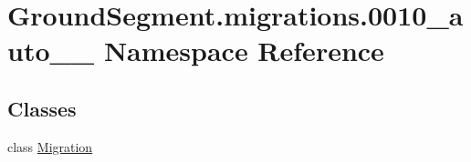 \hypertarget{namespace_ground_segment_1_1migrations_1_10010__auto__20161127__2017}{}\section{Ground\+Segment.\+migrations.0010\+\_\+auto\+\_\+\_ Namespace Reference}
\label{namespace_ground_segment_1_1migrations_1_10010__auto__20161127__2017}
\subsection*{Classes}
\begin{DoxyCompactItemize}
\item 
class \hyperlink{class_ground_segment_1_1migrations_1_10010__auto__20161127__2017_1_1_migration}{Migration}
\end{DoxyCompactItemize}
